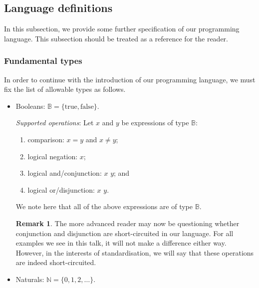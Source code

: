 \documentclass[11pt,a4paper,reqno]{amsart}
\theoremstyle{plain}
\theoremstyle{definition}
\theoremstyle{definition}
\newtheorem{remark}[theorem]{Remark}
\newcommand\hl[1]{\colorbox{gray!10}{#1}}
\begin{document}
\subsection{Language definitions}
In this subsection, we provide some further specification of our programming language.
This subsection should be treated as a reference for the reader.

\subsubsection{Fundamental types}\label{sec:fundamental-types}

In order to continue with the introduction of our programming language, we must fix the list of allowable types as follows.
\begin{itemize}[leftmargin=2em]
  \item Booleans: $\mathbb B = \{\mathrm{true}, \mathrm{false}\}$.

	      \smallskip
	      \noindent
	      \textit{Supported operations}:
        Let $x$ and $y$ be expressions of type $\mathbb B$:
        \begin{enumerate}
          \item comparison: \hl{$x = y$} and \hl{$x \neq y$};
          \item logical negation: \hl{{\Not $x$}};
          \item logical and/conjunction: \hl{$x$ \And $y$}; and
          \item logical or/disjunction: \hl{$x$ \Or $y$}.
        \end{enumerate}
        We note here that all of the above expressions are of type $\mathbb B$.

        \medskip

        \begin{remark}
        The more advanced reader may now be questioning whether conjunction and disjunction are short-circuited in our language.
        For all examples we see in this talk, it will not make a difference either way.
        However, in the interests of standardisation, we will say that these operations are indeed short-circuited.
        \end{remark}

        \medskip

	\item Naturals: $\mathbb N = \{0,1,2,\ldots\}$.


\end{itemize}
\end{document}
